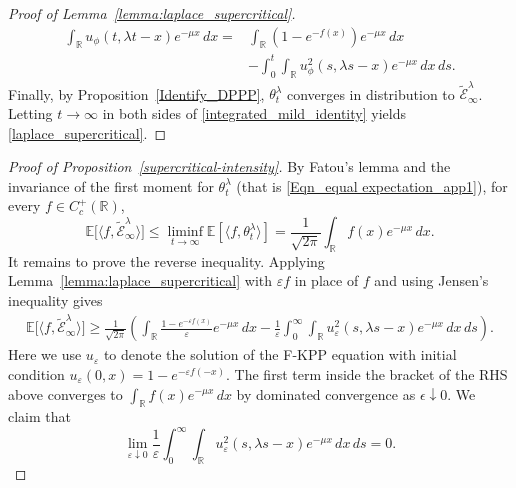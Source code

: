\documentclass[a4paper,reqno]{amsart}%
\newcommand{\1}{\mathbf 1}
\theoremstyle{mine}
\numberwithin{theorem}{section}
\numberwithin{equation}{section}
\theoremstyle{remark}
\begin{document}
\begin{proof}[Proof of Lemma~\ref{lemma:laplace_supercritical}]
    \begin{equation}\label{integrated_mild_identity} \begin{aligned} \int_{\mathbb R} u_{\phi}(t,\lambda t-x)e^{-\mu x}\,dx = &\int_{\mathbb R} (1-e^{-f(x)})e^{-\mu x}\,dx \\ &- \int_0^t\int_{\mathbb R} u_{\phi}^2(s,\lambda s-x)e^{-\mu x}\,dx\,ds . \end{aligned} \end{equation} 
    Finally, by Proposition~\ref{Identify_DPPP}, $\theta_t^\lambda$ converges in distribution to $\widetilde{\mathcal E}^{\lambda}_{\infty}$. Letting $t\to\infty$ in both sides of \eqref{integrated_mild_identity} yields \eqref{laplace_supercritical}. \end{proof}
   
   \begin{proof}[Proof of Proposition~\ref{supercritical-intensity}] By Fatou's lemma and the invariance of the first moment for $\theta^\lambda_t$ (that is \eqref{Eqn_equal expectation_app1}), for every $f\in C_c^+(\mathbb R)$, 
   \begin{equation}
        \mathbb E\big[ \langle f,\widetilde{\mathcal E}^{\lambda}_{\infty}\rangle \big] \le \liminf_{t\to\infty} \mathbb E[\langle f,\theta_t^\lambda\rangle] = \frac{1}{\sqrt{2\pi}}\int_{\mathbb R}f(x)e^{-\mu x}\,dx . 
    \end{equation}
   It remains to prove the reverse inequality. Applying Lemma~\ref{lemma:laplace_supercritical} with $\varepsilon f$ in place of $f$ and using Jensen's inequality gives 
   \[ \begin{aligned} \mathbb E\big[ \langle f,\widetilde{\mathcal E}^{\lambda}_{\infty}\rangle \big] \ge \frac{1}{\sqrt{2\pi}}\left(\int_{\mathbb R} \frac{1-e^{-\varepsilon f(x)}}{\varepsilon} e^{-\mu x}\,dx - \frac1\varepsilon \int_0^\infty\int_{\mathbb R} u_{\varepsilon }^2(s,\lambda s-x)e^{-\mu x}\,dx\,ds\right) . \end{aligned} \] Here we use $u_{\varepsilon }$ to denote the solution of the F-KPP equation with initial condition $u_\varepsilon(0,x) = 1-e^{-\varepsilon f(-x)}$.
   The first term inside the bracket of the RHS above converges to $\int_{\mathbb R} f(x)e^{-\mu x}\,dx$ by dominated convergence as $\epsilon\downarrow 0$. We claim that 
   \begin{equation}\label{epsilon_error_vanishes} \lim_{\varepsilon\downarrow0} \frac1\varepsilon \int_0^\infty\int_{\mathbb R} u_{\varepsilon }^2(s,\lambda s-x)e^{-\mu x}\,dx\,ds = 0. \end{equation}

\end{proof}
\end{document}
